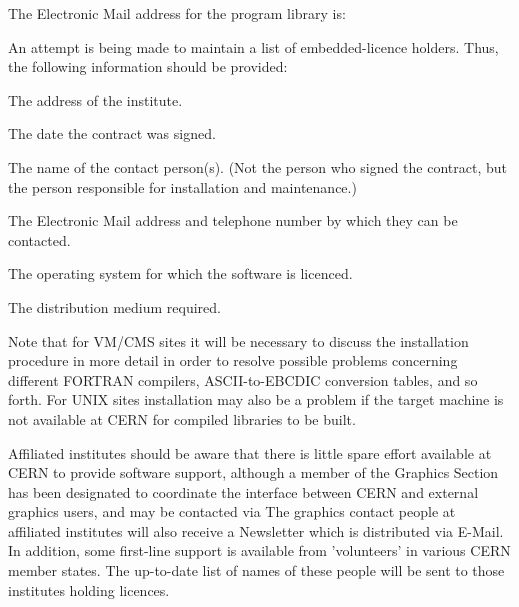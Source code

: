 The Electronic Mail address for the program library is:
 
An attempt is being made to maintain a list of embedded-licence
holders. Thus, the following information should be provided:
\begin{OL}
\item The address of the institute.
\item The date the contract was signed.
\item The name of the contact person(s).
(Not the person who signed the contract, but the person
responsible for installation and maintenance.)
\item The Electronic Mail address and telephone number
by which they can be contacted.
\item The operating system for which the software is licenced.
\item The distribution medium required.
\end{OL}
Note that for VM/CMS sites it will be necessary to discuss the
installation procedure in more detail in order to resolve possible problems
concerning different FORTRAN compilers, ASCII-to-EBCDIC
conversion tables, and so forth. For UNIX sites installation may
also be a problem if the target machine is not available at CERN
for compiled libraries to be built.
 
Affiliated institutes should be aware that there is little spare effort
available at CERN to provide software support,
although a member of the Graphics Section has been designated to
coordinate the interface between CERN and external graphics users,
and may be contacted via
The graphics contact people at affiliated institutes will also
receive a Newsletter which is distributed via E-Mail.
In addition, some first-line support is available from 'volunteers'
in various CERN member states.
The up-to-date list of names of these people will be sent to those
institutes holding licences.

